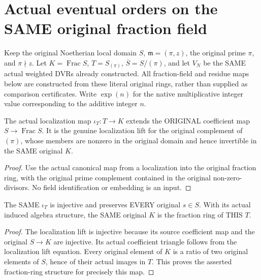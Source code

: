 \section{Actual eventual orders on the SAME original fraction field}

Keep the original Noetherian local domain $S$, $\mathfrak m=(\pi,z)$,
the original prime $\pi$, and $\pi\nmid z$. Let $K=\operatorname{Frac}S$,
$T=S_{(\pi)}$, $\overline S=S/(\pi)$, and let $V_N$ be the SAME actual
weighted DVRs already constructed. All fraction-field and residue maps below
are constructed from these literal original rings, rather than supplied as
comparison certificates. Write $\exp(n)$ for the native multiplicative
integer value corresponding to the additive integer $n$.

\begin{definition}
\label{def:gauss-surface-original-vertical-fraction-map}
\leanok
\leavevmode\par
The actual localization map $\iota_T:T\to K$ extends the ORIGINAL coefficient
map $S\to\operatorname{Frac}S$. It is the genuine localization lift for the
original complement of $(\pi)$, whose members are nonzero in the original
domain and hence invertible in the SAME original $K$.
\end{definition}
\begin{proof}
Use the actual canonical map from a localization into the original fraction
ring, with the original prime complement contained in the original
non-zero-divisors. No field identification or embedding is an input.
\end{proof}

\begin{lemma}
\label{lem:gauss-surface-original-vertical-fraction-identities}
\leanok
\leavevmode\par
The SAME $\iota_T$ is injective and preserves EVERY original $s\in S$.
With its actual induced algebra structure, the SAME original $K$ is the
fraction ring of THIS $T$.
\end{lemma}
\begin{proof}
The localization lift is injective because its source coefficient map and
the original $S\to K$ are injective. Its actual coefficient triangle follows
from the localization lift equation. Every original element of $K$ is a
ratio of two original elements of $S$, hence of their actual images in $T$.
This proves the asserted fraction-ring structure for precisely this map.
\end{proof}

